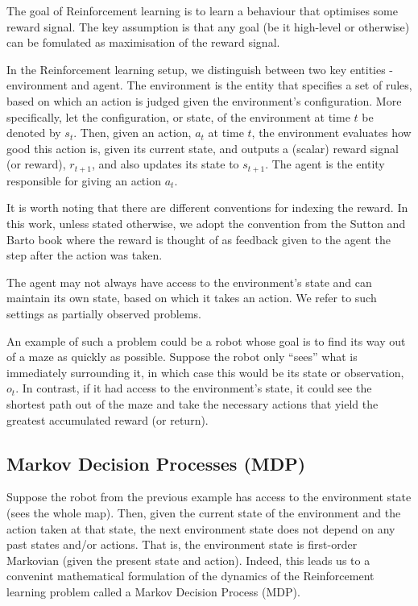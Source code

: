 \documentclass{report}
\numberwithin{equation}{section}
\numberwithin{figure}{section}
\numberwithin{table}{section}
\numberwithin{algorithm}{section}
\begin{document}
The goal of Reinforcement learning is to learn a behaviour that 
optimises some reward signal. The key assumption is that 
any goal (be it high-level or otherwise) can be fomulated as 
maximisation of the reward signal.

In the Reinforcement learning setup, we distinguish between two 
key entities - environment and agent. The environment is the 
entity that specifies a set of rules, based on which an action 
is judged given the environment's configuration. 
More specifically, let the configuration, or state, of the 
environment at time $t$ be denoted by $s_t$. Then, 
given an action, $a_t$ at time $t$, the environment evaluates 
how good this action is, given its 
current state, and outputs a (scalar) reward signal (or reward), 
$r_{t+1}$, and also updates its state to $s_{t+1}$. The agent 
is the entity responsible for giving an action $a_t$. 

It is worth noting that there are 
different conventions for indexing the reward. In this work, 
unless stated otherwise, 
we adopt the convention from the Sutton and Barto book 
\citep{Sutton1998} where the reward is thought of as feedback 
given to the agent the step after the action was taken.

The agent may not always have access 
to the environment's state and can maintain its own state, based 
on which it takes an action. We refer to such settings as partially 
observed problems. 

An example of such a problem could be a robot 
whose goal is to find its way out of a maze as quickly as possible.
Suppose the robot only ``sees'' what is 
immediately surrounding it, in which case this would be its state 
or observation, $o_t$. 
In contrast, if it had access to the environment's state, it could 
see the shortest path out of the maze and take the necessary actions 
that yield the greatest accumulated reward (or return).

\subsection{Markov Decision Processes (MDP)}
\label{sec:RLMDP}
Suppose the robot from the previous example has access to the 
environment state (sees the whole map). Then, given the 
current state of the environment 
and the action taken 
at that state, the next environment state does not depend on any 
past states and/or actions. That is, the 
environment state is first-order Markovian 
(given the present state and action). Indeed, this 
leads us to a convenint 
mathematical formulation of the dynamics of the 
Reinforcement learning problem called 
a Markov Decision Process (MDP).
\end{document}
